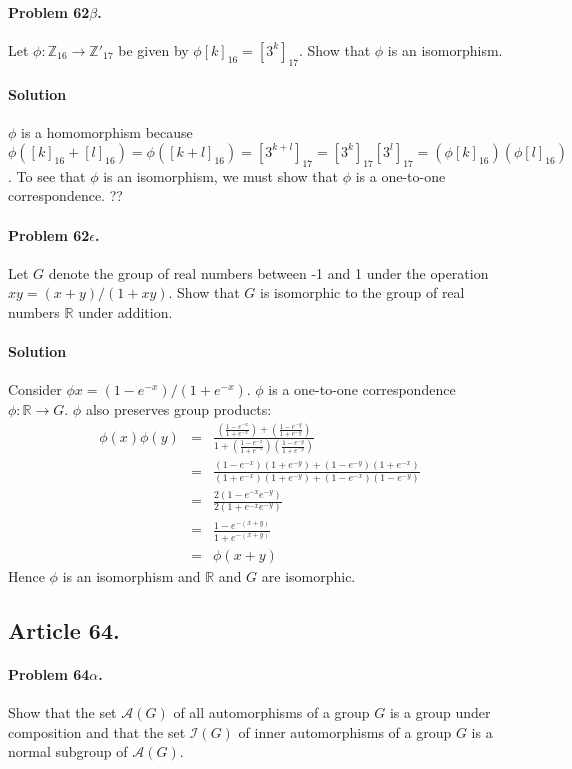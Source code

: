 \paragraph{Problem 62$\beta$.}
Let $\phi : \mathbb{Z}_{16} \rightarrow \mathbb{Z'}_{17}$ be given by
$\phi [k]_{16} = [3^k]_{17}$. Show that $\phi$ is an isomorphism.

\paragraph*{Solution}
$\phi$ is a homomorphism because $\phi([k]_{16} + [l]_{16}) = \phi([k+l]_{16}) = [3^{k+l}]_{17}
= [3^k]_{17}[3^l]_{17} = (\phi [k]_{16})(\phi[l]_{16})$. To see that $\phi$ is an isomorphism,
we must show that $\phi$ is a one-to-one correspondence. ??

\paragraph{Problem 62$\epsilon$.}
Let $G$ denote the group of real numbers between -1 and 1 under the operation
$x y = (x+y)/(1+xy)$. Show that $G$ is isomorphic to the group of real numbers
$\mathbb{R}$ under addition.

\paragraph*{Solution}
Consider $\phi x = (1-e^{-x}) / (1 + e^{-x})$. $\phi$ is a one-to-one correspondence
$\phi : \mathbb{R} \rightarrow G$. $\phi$ also preserves group products:
\begin{eqnarray*}
\phi(x)\phi(y) & = & \frac{(\frac{1-e^{-x}}{1+e^{-x}}) + (\frac{1-e^{-y}}{1+e^{-y}})}
{1 + (\frac{1-e^{-x}}{1+e^{-x}})(\frac{1-e^{-y}}{1+e^{-y}})} \\
& = & \frac{(1-e^{-x})(1+e^{-y}) + (1-e^{-y})(1+e^{-x})}
{(1+e^{-x})(1+e^{-y})+(1-e^{-x})(1-e^{-y})} \\
& = & \frac{2(1-e^{-x}e^{-y})}{2(1 + e^{-x}e^{-y})} \\
& = & \frac{1 - e^{-(x+y)}}{1+e^{-(x+y)}} \\
& = & \phi (x+y)
\end{eqnarray*}
Hence $\phi$ is an isomorphism and $\mathbb{R}$ and $G$ are isomorphic.

\subsection{Article 64.}

\paragraph{Problem 64$\alpha$.}
Show that the set $\mathcal{A}(G)$ of all automorphisms of a group $G$
is a group under composition and that the set $\mathcal{I}(G)$ of inner
automorphisms of a group $G$ is a normal subgroup of $\mathcal{A}(G)$.

